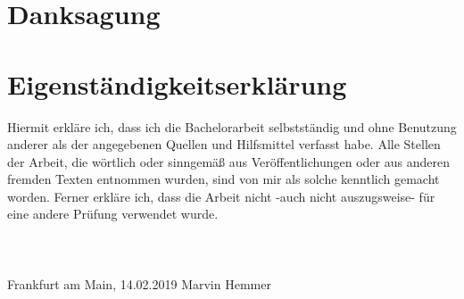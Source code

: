 \documentclass[a4paper,11pt,twoside]{report}
\renewcommand{\,}{,\!} %
\begin{document}
\chapter{Danksagung} \label{Appendix:B}

\clearpage

\chapter*{Eigenständigkeitserklärung}
Hiermit erkläre ich, dass ich die Bachelorarbeit selbstständig und ohne Benutzung anderer als der angegebenen Quellen und Hilfsmittel verfasst habe.
Alle Stellen der Arbeit, die wörtlich oder sinngemäß aus Veröffentlichungen oder aus anderen fremden Texten entnommen wurden, sind von mir als solche kenntlich gemacht worden.
Ferner erkläre ich, dass die Arbeit nicht -auch nicht auszugsweise- für eine andere Prüfung verwendet wurde. \\ \\ \\ \\
\hspace*{1cm} Frankfurt am Main, 14.02.2019 
\hspace*{2cm} Marvin Hemmer 
\end{document}

